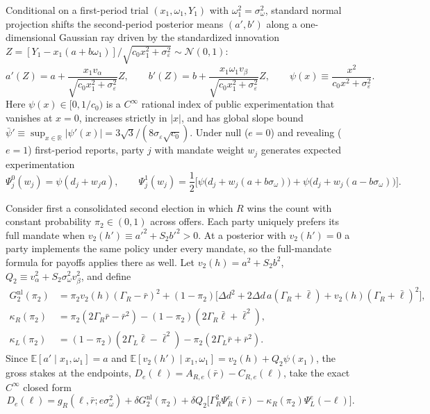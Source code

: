 \documentclass[11pt,letterpaper]{article}
\newcommand{\E}{\mathbb E}
\newcommand{\Dd}{\Delta d}
\begin{document}
Conditional on a first-period trial $(x_1,\omega_1,Y_1)$ with $\omega_1^2=\sigma_\omega^2$, standard normal projection shifts the second-period posterior means $(a',b')$ along a one-dimensional Gaussian ray driven by the standardized innovation $Z=[Y_1-x_1(a+b\omega_1)]/\sqrt{c_0 x_1^2+\sigma_\varepsilon^2}\sim\mathcal N(0,1)$:
\begin{equation}
 a'(Z)=a+\frac{x_1 v_\alpha}{\sqrt{c_0 x_1^2+\sigma_\varepsilon^2}}Z,\qquad
 b'(Z)=b+\frac{x_1\omega_1 v_\beta}{\sqrt{c_0 x_1^2+\sigma_\varepsilon^2}}Z,\qquad
 \psi(x)\equiv\frac{x^2}{c_0 x^2+\sigma_\varepsilon^2}.
 \label{eq:psi}
\end{equation}
Here $\psi(x)\in[0,1/c_0)$ is a $C^\infty$ rational index of public experimentation that vanishes at $x=0$, increases strictly in $|x|$, and has global slope bound $\bar\psi'\equiv\sup_{x\in\mathbb R}|\psi'(x)|=3\sqrt{3}/(8\sigma_\varepsilon\sqrt{c_0})$. Under null ($e=0$) and revealing ($e=1$) first-period reports, party $j$ with mandate weight $w_j$ generates expected experimentation
\[
 \Psi_j^0(w_j)=\psi(d_j+w_j a),\qquad
 \Psi_j^1(w_j)=\frac{1}{2}\Big[\psi\big(d_j+w_j(a+b\sigma_\omega)\big)+\psi\big(d_j+w_j(a-b\sigma_\omega)\big)\Big].
\]

Consider first a consolidated second election in which $R$ wins the count with constant probability $\pi_2\in(0,1)$ across offers. Each party uniquely prefers its full mandate when $v_2(h')\equiv a'^2+S_2 b'^2>0$. At a posterior with $v_2(h')=0$ a party implements the same policy under every mandate, so the full-mandate formula for payoffs applies there as well. Let $v_2(h)=a^2+S_2 b^2$, $Q_2\equiv v_\alpha^2+S_2\sigma_\omega^2v_\beta^2$, and define
\begin{align*}
 G_2^{\mathrm{nl}}(\pi_2) &= \pi_2 v_2(h)(\Gamma_R-\bar r)^2+(1-\pi_2)\big[\Dd^2+2\Dd\,a(\Gamma_R+\bar\ell)+v_2(h)(\Gamma_R+\bar\ell)^2\big],\\
 \kappa_R(\pi_2) &= \pi_2(2\Gamma_R\bar r-\bar r^2)-(1-\pi_2)(2\Gamma_R\bar\ell+\bar\ell^2),\\
 \kappa_L(\pi_2) &= (1-\pi_2)(2\Gamma_L\bar\ell-\bar\ell^2)-\pi_2(2\Gamma_L\bar r+\bar r^2).
\end{align*}
Since $\E[a'\mid x_1,\omega_1]=a$ and $\E[v_2(h')\mid x_1,\omega_1]=v_2(h)+Q_2\psi(x_1)$, the gross stakes at the endpoints, $D_e(\ell)=A_{R,e}(\bar r)-C_{R,e}(\ell)$, take the exact $C^\infty$ closed form
\begin{equation}
 D_e(\ell)=g_R(\ell,\bar r;e\sigma_\omega^2)+\delta G_2^{\mathrm{nl}}(\pi_2)
 +\delta Q_2\Big[\Gamma_R^2\Psi_R^e(\bar r)-\kappa_R(\pi_2)\Psi_L^e(-\ell)\Big].
 \label{eq:gaussD}
\end{equation}
\end{document}
